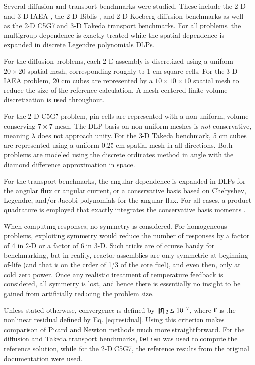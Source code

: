 Several diffusion and transport benchmarks were studied.  These 
include  the 2-D and 3-D IAEA \cite{anl1977benchmark}, the 2-D 
Biblis \cite{muller1991bmd}, and 2-D Koeberg diffusion benchmarks as well 
as the 2-D C5G7 \cite{lewis2001bsd} 
and 3-D Takeda \cite{takeda1991ntb} transport benchmarks.
For all problems, the multigroup dependence is exactly treated while the 
spatial dependence is expanded in discrete Legendre polynomials 
\cite{mosher2006ifr, roberts2014arm} DLPs.  

For the diffusion 
problems, each 2-D assembly is discretized 
using a uniform $20\times 20$ spatial mesh, corresponding roughly to 
1 cm square cells.  For the 3-D IAEA problem, 20 cm cubes are 
represented by a $10 \times 10 \times 10$ spatial mesh to reduce 
the size of the reference calculation.   A mesh-centered finite 
volume discretization is used throughout.

For the 2-D C5G7 problem, pin cells are represented with 
a non-uniform, volume-conserving $7\times 7$ 
mesh.   The DLP basis on non-uniform meshes is {\it not} 
conservative, meaning $\lambda$ does not approach unity.
For the 3-D Takeda benchmark, 5 cm 
cubes are represented using a uniform 0.25 cm spatial mesh in 
all directions.  Both problems are modeled using the discrete ordinates 
method in angle with the diamond difference
approximation in space.

For the transport benchmarks, the angular dependence is expanded 
in DLPs for the angular flux or 
angular current, or a conservative basis based on Chebyshev, Legendre, 
and/or Jacobi polynomials \cite{roberts2014arm, zhang2012ehs} 
for the angular flux.  For all cases, a product quadrature is employed 
that exactly integrates the conservative basis moments \cite{roberts2014arm}.

When computing responses, no symmetry is considered.  For homogeneous
problems, exploiting symmetry would reduce the number of responses 
by a factor of 4 in 2-D or a factor of 6 in 3-D.  Such tricks are 
of course handy for benchmarking, but in reality, reactor assemblies 
are only symmetric at beginning-of-life (and that is on the order 
of 1/3 of the core fuel), and even then, only at cold zero power.  Once
any realistic treatment of temperature feedback is considered, all 
symmetry is lost, and hence there is essentially no insight to be gained 
from artificially reducing the problem size.

Unless stated otherwise, 
convergence is defined by $||\mathbf{f}||_2 \leq 10^{-7}$, where
$\mathbf{f}$ is the nonlinear residual defined by Eq. \ref{eq:residual}.
Using this criterion makes comparison of Picard and Newton methods much 
more straightforward.   For the diffusion and Takeda transport 
benchmarks, {\tt Detran} was used to compute the reference solution, 
while for the 2-D C5G7, the reference results from the original 
documentation were used.

